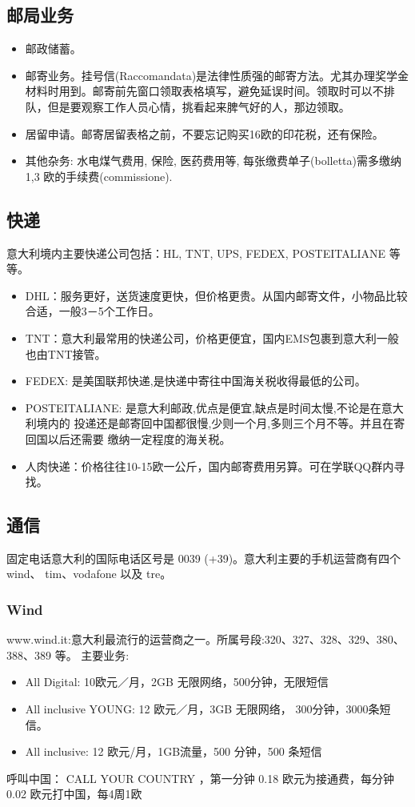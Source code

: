 \documentclass[3pt,a5paper,openright,twoside]{book}
\begin{document}
\subsection{邮局业务}
\begin{itemize}
\item 邮政储蓄。
\item 邮寄业务。挂号信(Raccomandata)是法律性质强的邮寄方法。尤其办理奖学金材料时用到。邮寄前先窗口领取表格填写，避免延误时间。领取时可以不排队，但是要观察工作人员心情，挑看起来脾气好的人，那边领取。
\item 居留申请。邮寄居留表格之前，不要忘记购买16欧的印花税，还有保险。
\item 其他杂务: 水电煤气费用, 保险, 医药费用等, 每张缴费单子(bolletta)需多缴纳1,3 欧的手续费(commissione).

\end{itemize}

\subsection{快递}
意大利境内主要快递公司包括：HL, TNT, UPS, FEDEX, POSTEITALIANE 等等。
\begin{itemize}
\item DHL：服务更好，送货速度更快，但价格更贵。从国内邮寄文件，小物品比较合适，一般3－5个工作日。
\item TNT：意大利最常用的快递公司，价格更便宜，国内EMS包裹到意大利一般也由TNT接管。
\item FEDEX: 是美国联邦快递,是快递中寄往中国海关税收得最低的公司。
\item POSTEITALIANE: 是意大利邮政,优点是便宜,缺点是时间太慢,不论是在意大利境内的 投递还是邮寄回中国都很慢,少则一个月,多则三个月不等。并且在寄回国以后还需要
缴纳一定程度的海关税。
\item 人肉快递：价格往往10-15欧一公斤，国内邮寄费用另算。可在学联QQ群内寻找。
\end{itemize}

\subsection{通信}
固定电话意大利的国际电话区号是 0039 (+39)。意大利主要的手机运营商有四个 wind、 tim、vodafone 以及 tre。 

\subsubsection{Wind}
www.wind.it:意大利最流行的运营商之一。所属号段:320、327、328、329、380、 388、389 等。
主要业务:
\begin{itemize}
\item All Digital: 10欧元／月，2GB 无限网络，500分钟，无限短信
\item All inclusive YOUNG:  12 欧元／月，3GB 无限网络， 300分钟，3000条短信。
\item All inclusive:  12 欧元/月，1GB流量，500 分钟，500 条短信
\end{itemize}
呼叫中国： CALL YOUR COUNTRY ，第一分钟 0.18 欧元为接通费，每分钟 0.02 欧元打中国，每4周1欧
\end{document}
